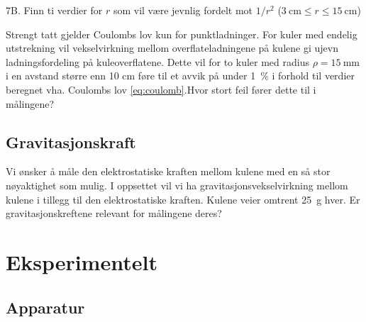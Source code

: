 \documentclass[../Elmag-labhefte-2020.tex]{subfiles}
\begin{document}
\begin{itemize}
{\itsf 7B. Finn ti verdier for $r$ som vil v\ae re jevnlig fordelt mot $1/r^2$\/} ($\SI{3}{\cm} \leq r \leq \SI{15}{\cm}$)


Strengt tatt gjelder Coulombs lov kun for punktladninger. For kuler med endelig utstrekning vil vekselvirkning mellom overflateladningene på kulene gi ujevn ladningsfordeling på kuleoverflatene. Dette vil for to kuler med radius $\rho = \SI{15}{\milli\m}$ i en avstand større enn 10 cm føre til et avvik på under \SI{1}{\percent} i forhold til verdier beregnet vha. Coulombs lov \eqref{eq:coulomb}.Hvor stort feil fører dette til i målingene? 


\subsection{Gravitasjonskraft}

Vi ønsker å måle den elektrostatiske kraften mellom kulene med en så stor nøyaktighet som mulig. I oppsettet vil vi ha gravitasjonsvekselvirkning mellom kulene i tillegg til den elektrostatiske kraften. Kulene veier omtrent \SI{25}{\g} hver. Er gravitasjonskreftene relevant for målingene deres?

 
\clearpage


\section{Eksperimentelt}

\subsection{Apparatur}


\end{itemize}
\end{document}
